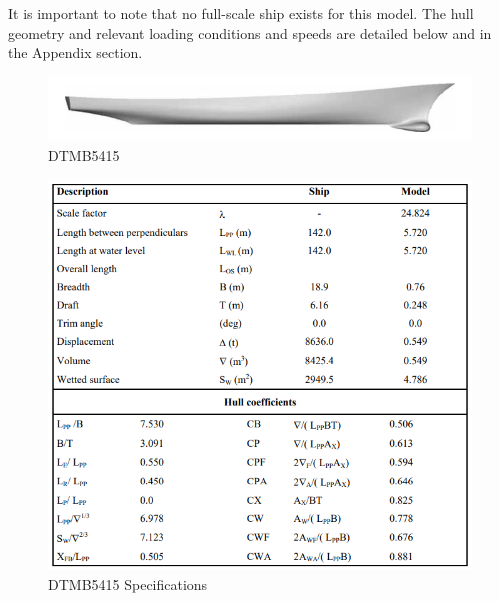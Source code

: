 \documentclass[12pt]{article} %
\begin{document}
It is important to note that no full-scale ship exists for this model. The hull geometry and relevant 
loading conditions and speeds are detailed below and in the Appendix section.
\begin{figure}[ht]
    \centering
    \includegraphics[width=1\textwidth]{DTMB.png}
    \caption{DTMB5415}
\end{figure}
\begin{figure}[ht]
    \centering
    \includegraphics[width=1\textwidth]{DTMBsp.png}
    \caption{DTMB5415 Specifications\cite{olivieri2001}}
\end{figure}
\clearpage
\end{document}
